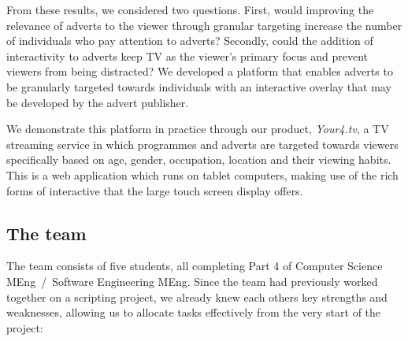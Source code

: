 From these results, we considered two questions. First, would improving the relevance of adverts to the viewer through granular targeting increase the number of individuals who pay attention to adverts? Secondly, could the addition of interactivity to adverts keep TV as the viewer's primary focus and prevent viewers from being distracted? We developed a platform that enables adverts to be granularly targeted towards individuals with an interactive overlay that may be developed by the advert publisher. 

We demonstrate this platform in practice through our product, \textit{Your4.tv}, a TV streaming service in which programmes and adverts are targeted towards viewers specifically based on age, gender, occupation, location and their viewing habits. This is a web application which runs on tablet computers, making use of the rich forms of interactive that the large touch screen display offers.




\subsection{The team}

The team consists of five students, all completing Part 4 of Computer Science MEng~/~Software Engineering MEng. Since the team had previously worked together on a scripting project, we already knew each others key strengths and weaknesses, allowing us to allocate tasks effectively from the very start of the project:

